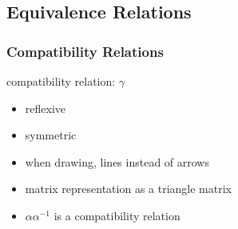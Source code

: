 \documentclass[dvipsnames]{beamer}
\begin{document}
\subsection{Equivalence Relations}

\begin{frame}
  \frametitle{Compatibility Relations}

  \begin{definition}
    \alert{compatibility relation}: $\gamma$
    \begin{itemize}
      \item reflexive
      \item symmetric
    \end{itemize}
  \end{definition}

  \pause
  \begin{itemize}
    \item when drawing, lines instead of arrows
    \item matrix representation as a triangle matrix
  \end{itemize}

  \pause
  \begin{itemize}
    \item $\alpha \alpha^{-1}$ is a compatibility relation
  \end{itemize}
\end{frame}
\end{document}
